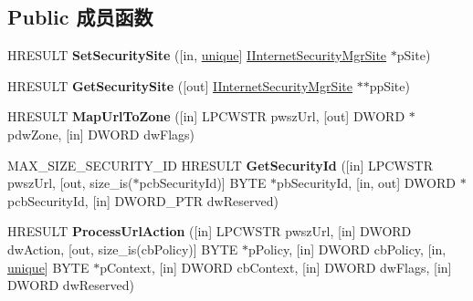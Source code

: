 \subsection*{Public 成员函数}
\begin{DoxyCompactItemize}
\item 
\mbox{\label{interface_i_internet_security_manager_ad04b3840a936baf18e1c7697f9e805c9}} 
H\+R\+E\+S\+U\+LT {\bfseries Set\+Security\+Site} (\mbox{[}in, \hyperlink{interfaceunique}{unique}\mbox{]} \hyperlink{interface_i_internet_security_mgr_site}{I\+Internet\+Security\+Mgr\+Site} $\ast$p\+Site)
\item 
\mbox{\label{interface_i_internet_security_manager_a03ab37d31733aaec53f89ed1f94bf0bf}} 
H\+R\+E\+S\+U\+LT {\bfseries Get\+Security\+Site} (\mbox{[}out\mbox{]} \hyperlink{interface_i_internet_security_mgr_site}{I\+Internet\+Security\+Mgr\+Site} $\ast$$\ast$pp\+Site)
\item 
\mbox{\label{interface_i_internet_security_manager_ad47ffa6a818d899e20fad6a775f3b78a}} 
H\+R\+E\+S\+U\+LT {\bfseries Map\+Url\+To\+Zone} (\mbox{[}in\mbox{]} L\+P\+C\+W\+S\+TR pwsz\+Url, \mbox{[}out\mbox{]} D\+W\+O\+RD $\ast$pdw\+Zone, \mbox{[}in\mbox{]} D\+W\+O\+RD dw\+Flags)
\item 
\mbox{\label{interface_i_internet_security_manager_a377e1793b02cc76a6bd5013f5f8605e5}} 
M\+A\+X\+\_\+\+S\+I\+Z\+E\+\_\+\+S\+E\+C\+U\+R\+I\+T\+Y\+\_\+\+ID H\+R\+E\+S\+U\+LT {\bfseries Get\+Security\+Id} (\mbox{[}in\mbox{]} L\+P\+C\+W\+S\+TR pwsz\+Url, \mbox{[}out, size\+\_\+is($\ast$pcb\+Security\+Id)\mbox{]} B\+Y\+TE $\ast$pb\+Security\+Id, \mbox{[}in, out\mbox{]} D\+W\+O\+RD $\ast$pcb\+Security\+Id, \mbox{[}in\mbox{]} D\+W\+O\+R\+D\+\_\+\+P\+TR dw\+Reserved)
\item 
\mbox{\label{interface_i_internet_security_manager_a302b3f69501b52aefc1abe5a8120563d}} 
H\+R\+E\+S\+U\+LT {\bfseries Process\+Url\+Action} (\mbox{[}in\mbox{]} L\+P\+C\+W\+S\+TR pwsz\+Url, \mbox{[}in\mbox{]} D\+W\+O\+RD dw\+Action, \mbox{[}out, size\+\_\+is(cb\+Policy)\mbox{]} B\+Y\+TE $\ast$p\+Policy, \mbox{[}in\mbox{]} D\+W\+O\+RD cb\+Policy, \mbox{[}in, \hyperlink{interfaceunique}{unique}\mbox{]} B\+Y\+TE $\ast$p\+Context, \mbox{[}in\mbox{]} D\+W\+O\+RD cb\+Context, \mbox{[}in\mbox{]} D\+W\+O\+RD dw\+Flags, \mbox{[}in\mbox{]} D\+W\+O\+RD dw\+Reserved)
$$
\end{DoxyCompactItemize}
